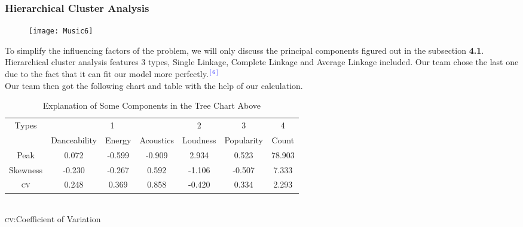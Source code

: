 \documentclass[12pt]{article}
\begin{document}
{\subsubsection{Hierarchical Cluster Analysis}
\begin{wrapfigure}{l}{10cm}
\centering
	\texttt{[image: Music6]}
	\end{wrapfigure}
To simplify the influencing factors of the problem, we will only discuss the principal components figured out in the subsection {\textbf{4.1}}.\\[2ex]
Hierarchical cluster analysis features 3 types, Single Linkage, Complete Linkage and Average Linkage included. Our team chose the last one due to the fact that it can fit our model more perfectly.\textcolor{blue}{$^{[6]}$}\\[2ex]
Our team then got the following chart and table with the help of our calculation.\\
\begin{table}[h]
	\centering
	\begin{tabular}{|c|c|c|c|c|c|c|}
	\hline
	 \multirow{2}{*}{Types} &\multicolumn{3}{c|}{1} &2 &3 &4\\
	 \cline{2-7}
	 &Danceability &Energy &Acoustics &Loudness &Popularity &Count\\
	 \hline
	 Peak & 0.072 &-0.599 &-0.909 &2.934 &0.523 & 78.903\\
	 Skewness & -0.230 &-0.267 &0.592 &-1.106 &-0.507 & 7.333\\
	 {\textsc{cv}} &0.248 &0.369 &0.858 &-0.420 &0.334 &2.293\\
	 \hline
	\end{tabular}\\
{\textsc{cv}}:Coefficient of Variation
\caption{Explanation of Some Components in the Tree Chart Above}
\end{table}

}
\end{document}

